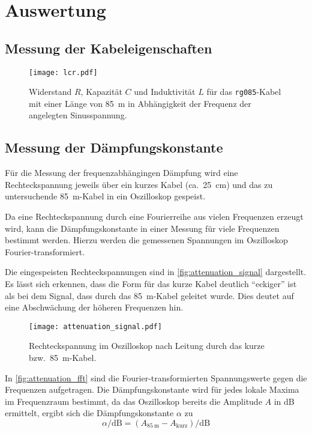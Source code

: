 \section{Auswertung}
\label{sec:Auswertung}

\subsection{Messung der Kabeleigenschaften}

\begin{figure}
  \centering
  \texttt{[image: lcr.pdf]}
  \caption{Widerstand $R$, Kapazität $C$ und Induktivität $L$ für das \texttt{rg085}-Kabel mit einer Länge von \SI{85}{\meter} in Abhängigkeit der Frequenz der angelegten Sinusspannung.}
  \label{fig:lcr}
\end{figure}


\subsection{Messung der Dämpfungskonstante}

Für die Messung der frequenzabhängingen Dämpfung wird eine Rechteckspannung
jeweils über ein kurzes Kabel (ca.\ \SI{25}{\centi\meter}) und das zu untersuchende \SI{85}{\meter}-Kabel in ein Oszilloskop gespeist.

Da eine Rechteckspannung durch eine Fourierreihe aus vielen Frequenzen erzeugt wird,
kann die Dämpfungskonstante in einer Messung für viele Frequenzen bestimmt werden.
Hierzu werden die gemessenen Spannungen im Oszilloskop Fourier-transformiert.

Die eingespeisten Rechteckspannungen sind in \autoref{fig:attenuation_signal} dargestellt.
Es lässt sich erkennen, dass die Form für das kurze Kabel deutlich \enquote{eckiger} ist als bei dem Signal, dass durch das \SI{85}{\meter}-Kabel geleitet wurde.
Dies deutet auf eine Abschwächung der höheren Frequenzen hin.

\begin{figure}
  \centering
  \texttt{[image: attenuation\_signal.pdf]}
  \caption{%
    Rechteckspannung im Oszilloskop nach Leitung durch das kurze bzw.\ \SI{85}{\meter}-Kabel.%
  }\label{fig:attenuation_signal}
\end{figure}

In \autoref{fig:attenuation_fft} sind die Fourier-transformierten Spannungswerte gegen die Frequenzen aufgetragen.
Die Dämpfungskonstante wird für jedes lokale Maxima im Frequenzraum bestimmt,
da das Oszilloskop bereits die Amplitude $A$ in \si{\deci\bel} ermittelt, ergibt sich die Dämpfungskonstante $α$ zu
\begin{equation}
  α / \si{\deci\bel} = (A_{\SI{85}{\meter}} - A_\text{kurz}) / \si{\deci\bel}
\end{equation}

